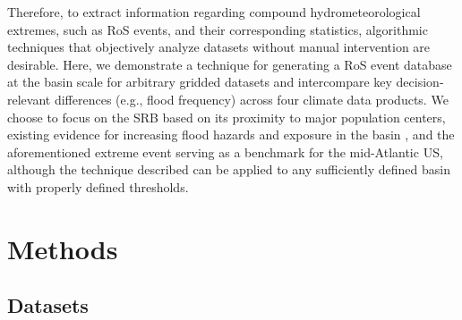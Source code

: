\documentclass[nhess, manuscript]{copernicus}
\begin{document}
Therefore, to extract information regarding compound hydrometeorological extremes, such as RoS events, and their corresponding statistics, algorithmic techniques that objectively analyze datasets without manual intervention are desirable.
Here, we demonstrate a technique for generating a RoS event database at the basin scale for arbitrary gridded datasets and intercompare key decision-relevant differences (e.g., flood frequency) across four climate data products.
We choose to focus on the SRB based on its proximity to major population centers, existing evidence for increasing flood hazards and exposure in the basin \citep{sharma2021regional}, and the aforementioned extreme event serving as a benchmark for the mid-Atlantic US, although the technique described can be applied to any sufficiently defined basin with properly defined thresholds.


\section{Methods}

\subsection{Datasets}
\end{document}
